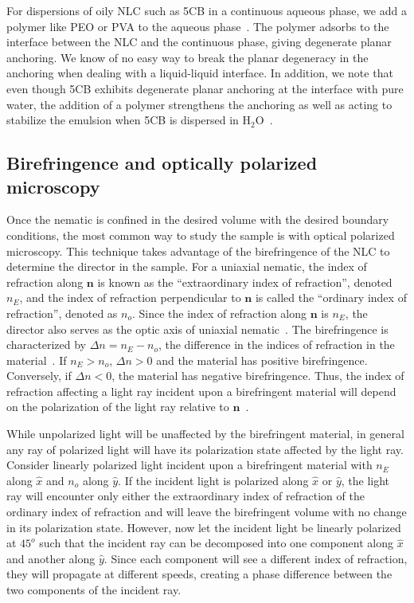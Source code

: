 For dispersions of oily NLC such as 5CB in a continuous aqueous phase, we add a polymer like PEO or PVA to the aqueous phase~\cite{RN105,RN93}.
The polymer adsorbs to the interface between the NLC and the continuous phase, giving degenerate planar anchoring.
We know of no easy way to break the planar degeneracy in the anchoring when dealing with a liquid-liquid interface.
In addition, we note that even though 5CB exhibits degenerate planar anchoring at the interface with pure water, the addition of a polymer strengthens the anchoring as well as acting to stabilize the emulsion when 5CB is dispersed in H$_2$O~\cite{RN105,RN93}.\\




\subsection{Birefringence and optically polarized microscopy}
Once the nematic is confined in the desired volume with the desired boundary conditions, the most common way to study the sample is with optical polarized microscopy.
This technique takes advantage of the birefringence of the NLC to determine the director in the sample.
For a uniaxial nematic, the index of refraction along $\mathbf{n}$ is known as the ``extraordinary index of refraction'', denoted $n_E$, and the index of refraction perpendicular to $\mathbf{n}$ is called the ``ordinary index of refraction'', denoted as $n_o$.
Since the index of refraction along $\mathbf{n}$ is $n_E$, the director also serves as the optic axis of uniaxial nematic~\cite{RN232}.
The birefringence is characterized by $\Delta n = n_E-n_o$, the difference in the indices of refraction in the material~\cite{RN232}.
If $n_E > n_o$, $\Delta n > 0$ and the material has positive birefringence.
Conversely, if $\Delta n < 0$, the material has negative birefringence.
Thus, the index of refraction affecting a light ray incident upon a birefringent material will depend on the polarization of the light ray relative to $\mathbf{n}$~\cite{RN232}.

While unpolarized light will be unaffected by the birefringent material, in general any ray of polarized light will have its polarization state affected by the light ray.
Consider linearly polarized light incident upon a birefringent material with $n_E$ along $\hat{x}$ and $n_o$ along $\hat{y}$.
If the incident light is polarized along $\hat{x}$ or $\hat{y}$, the light ray will encounter only either the extraordinary index of refraction of the ordinary index of refraction and will leave the birefringent volume with no change in its polarization state.
However, now let the incident light be linearly polarized at $45^o$ such that the incident ray can be decomposed into one component along $\hat{x}$ and another along $\hat{y}$.
Since each component will see a different index of refraction, they will propagate at different speeds, creating a phase difference between the two components of the incident ray.

